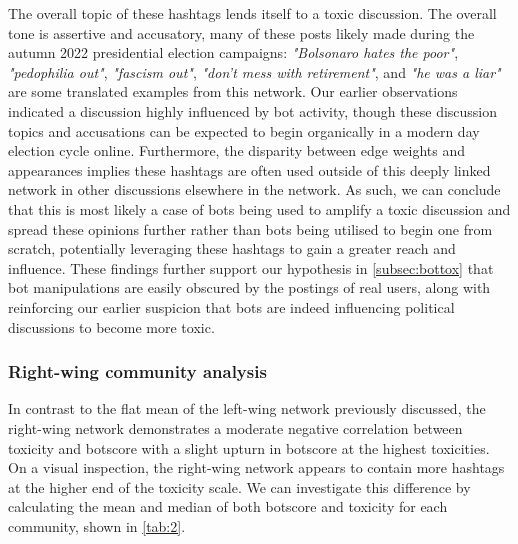 \documentclass[a4paper,11pt]{article}  %
\begin{document}
	The overall topic of these hashtags lends itself to a toxic discussion. The overall tone is assertive and accusatory, many of these posts likely made during the autumn 2022 presidential election campaigns: \textit{"Bolsonaro hates the poor"}, \textit{"pedophilia out"}, \textit{"fascism out"}, \textit{"don't mess with retirement"}, and \textit{"he was a liar"} are some translated examples from this network. Our earlier observations indicated a discussion highly influenced by bot activity, though these discussion topics and accusations can be expected to begin organically in a modern day election cycle online. Furthermore, the disparity between edge weights and appearances implies these hashtags are often used outside of this deeply linked network in other discussions elsewhere in the network. As such, we can conclude that this is most likely a case of bots being used to amplify a toxic discussion and spread these opinions further rather than bots being utilised to begin one from scratch, potentially leveraging these hashtags to gain a greater reach and influence. These findings further support our hypothesis in \autoref{subsec:bottox} that bot manipulations are easily obscured by the postings of real users, along with reinforcing our earlier suspicion that bots are indeed influencing political discussions to become more toxic.
	
	\subsubsection{Right-wing community analysis}
	In contrast to the flat mean of the left-wing network previously discussed, the right-wing network demonstrates a moderate negative correlation between toxicity and botscore with a slight upturn in botscore at the highest toxicities. On a visual inspection, the right-wing network appears to contain more hashtags at the higher end of the toxicity scale. We can investigate this difference by calculating the mean and median of both botscore and toxicity for each community, shown in \autoref{tab:2}.
\end{document}
